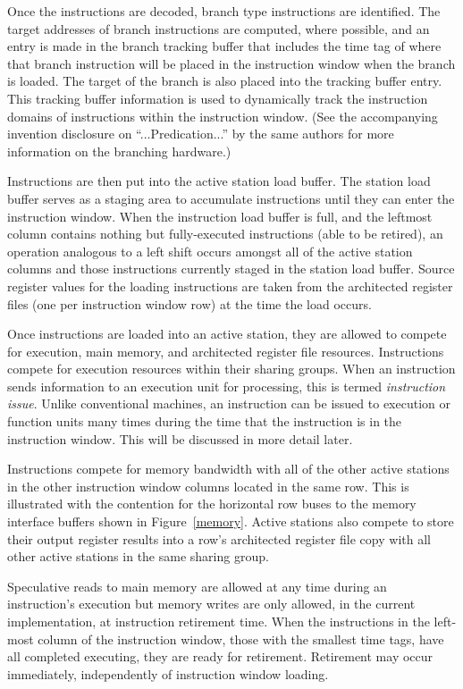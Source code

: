 \documentclass[10pt,dvips]{article}
\begin{document}
Once the instructions are decoded, branch type instructions are
identified.  The target addresses of branch instructions are computed,
where possible, and an entry is made in the branch tracking buffer that
includes the time tag of where that branch instruction will be placed
in the instruction window when the branch is loaded.  The target of
the branch is also placed into the tracking buffer entry.  This
tracking buffer information is used to dynamically track the
instruction domains of instructions within the instruction window.
(See the accompanying invention disclosure on ``...Predication...''
by the same authors for more information on the branching hardware.)

Instructions are then put into the active station load buffer.
The station load buffer serves as a staging area to accumulate
instructions until they can enter the instruction window.  When the
instruction load buffer is full, and the leftmost column contains nothing
but fully-executed instructions (able to be retired), an operation
analogous to a left shift occurs amongst all of the active station
columns and those instructions currently staged in the station load
buffer.  Source register values for the
loading instructions are taken from the
architected register files (one per instruction window row) at the time
the load occurs.

Once instructions are loaded into an active station, they are allowed
to compete for execution, main memory, and architected register
file resources.  Instructions compete for execution resources
within their sharing groups.  When an instruction sends information to
an execution unit for processing, this is termed {\it instruction
issue}.  Unlike conventional machines, an instruction can be issued to
execution or function units many times during the time that
the instruction is in
the instruction window.  This will be discussed in more detail later.

Instructions compete for memory bandwidth with all of the other active
stations in the other instruction window columns located in the same
row.  This is illustrated with the contention for the horizontal row
buses to the memory interface buffers shown in Figure~\ref{memory}.
Active
stations also compete to store their output register results into
a row's
architected register file copy with all other active stations
in the same sharing group.

Speculative reads to main memory are allowed at any time during an
instruction's execution but memory writes are only allowed, in the
current implementation, at instruction retirement time.
When the instructions in the
left-most column of the instruction window, those with the smallest
time tags, have all completed executing, they are ready for
retirement.  Retirement may occur immediately, independently of
instruction window loading.
\end{document}
